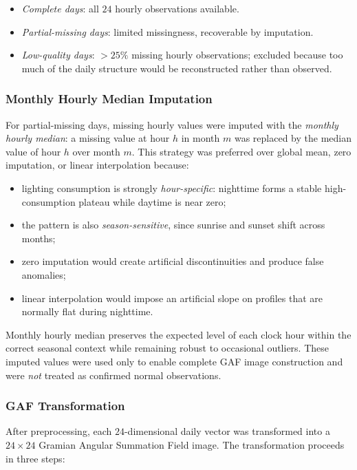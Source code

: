 \documentclass[11pt]{article}
\begin{document}
\begin{itemize}[leftmargin=1.5em,itemsep=1pt]
  \item \emph{Complete days}: all $24$ hourly observations available.
  \item \emph{Partial-missing days}: limited missingness, recoverable by imputation.
  \item \emph{Low-quality days}: $>25\%$ missing hourly observations; excluded because too much of the daily structure would be reconstructed rather than observed.
\end{itemize}

\subsubsection*{Monthly Hourly Median Imputation}
For partial-missing days, missing hourly values were imputed with the \emph{monthly hourly median}: a missing value at hour $h$ in month $m$ was replaced by the median value of hour $h$ over month $m$. This strategy was preferred over global mean, zero imputation, or linear interpolation because:

\begin{itemize}[leftmargin=1.5em,itemsep=1pt]
  \item lighting consumption is strongly \emph{hour-specific}: nighttime forms a stable high-consumption plateau while daytime is near zero;
  \item the pattern is also \emph{season-sensitive}, since sunrise and sunset shift across months;
  \item zero imputation would create artificial discontinuities and produce false anomalies;
  \item linear interpolation would impose an artificial slope on profiles that are normally flat during nighttime.
\end{itemize}

Monthly hourly median preserves the expected level of each clock hour within the correct seasonal context while remaining robust to occasional outliers. These imputed values were used only to enable complete GAF image construction and were \emph{not} treated as confirmed normal observations.

\subsubsection*{GAF Transformation}
After preprocessing, each $24$-dimensional daily vector was transformed into a $24 \times 24$ Gramian Angular Summation Field image. The transformation proceeds in three steps:
\end{document}
